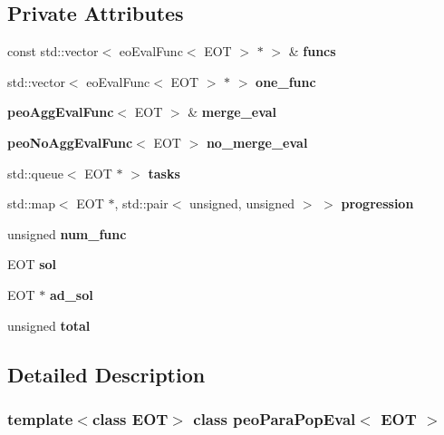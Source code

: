 \subsection*{Private Attributes}
\begin{CompactItemize}
\item 
const std::vector$<$ eo\-Eval\-Func$<$ EOT $>$ $\ast$ $>$ \& {\bf funcs}\label{classpeo_para_pop_eval_6d69b8f73c0b5d72baf75d6e53f025b7}

\item 
std::vector$<$ eo\-Eval\-Func$<$ EOT $>$ $\ast$ $>$ {\bf one\_\-func}\label{classpeo_para_pop_eval_f0e8af3ee442d2b6baf0bd122226be3c}

\item 
{\bf peo\-Agg\-Eval\-Func}$<$ EOT $>$ \& {\bf merge\_\-eval}\label{classpeo_para_pop_eval_b48bcd4e9f92f364118304535c089456}

\item 
{\bf peo\-No\-Agg\-Eval\-Func}$<$ EOT $>$ {\bf no\_\-merge\_\-eval}\label{classpeo_para_pop_eval_bf255dd5861e27108c2abae7309d7690}

\item 
std::queue$<$ EOT $\ast$ $>$ {\bf tasks}\label{classpeo_para_pop_eval_af76cd18368a0f6185878f37f0b5f272}

\item 
std::map$<$ EOT $\ast$, std::pair$<$ unsigned, unsigned $>$ $>$ {\bf progression}\label{classpeo_para_pop_eval_80e7e34bb1bb2d12f1f2eed3feac6ecf}

\item 
unsigned {\bf num\_\-func}\label{classpeo_para_pop_eval_87abb090c0de39f0ccc36af1f07cca0c}

\item 
EOT {\bf sol}\label{classpeo_para_pop_eval_fb6941e0455515a908eb82342b995163}

\item 
EOT $\ast$ {\bf ad\_\-sol}\label{classpeo_para_pop_eval_60cafeab376262af675fdff43434c8d8}

\item 
unsigned {\bf total}\label{classpeo_para_pop_eval_b528ad9dd9006c3dd57f149a3843e57d}

\end{CompactItemize}


\subsection{Detailed Description}
\subsubsection*{template$<$class EOT$>$ class peo\-Para\-Pop\-Eval$<$ EOT $>$}

